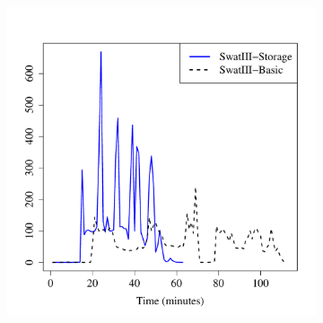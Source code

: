 \documentclass[conference]{IEEEtran}
\begin{document}
\begin{figure}[htb]
        \centering
        \begin{subfigure}[b]{0.3\textwidth}
                \includegraphics[width=\textwidth]{Figure/SystemData/Plots/BGHddSsdWrIops.pdf}

\end{subfigure}
\end{figure}
\end{document}

